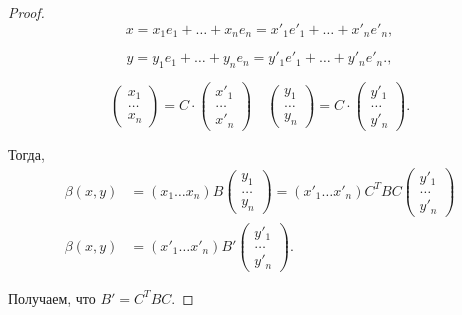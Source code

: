 \begin{proof}
    \begin{equation*}
        x = x_1 e_1 + \dots + x_n e_n = x'_1 e'_1 + \dots + x'_n e'_n
    ,\end{equation*}

    \begin{equation*}
        y = y_1 e_1 + \dots + y_n e_n = y'_1 e'_1 + \dots + y'_n e'_n.
    ,\end{equation*}

    \begin{equation*}
        \begin{pmatrix} x_1 \\ \dots \\ x_n \end{pmatrix} = C \cdot \begin{pmatrix} x'_1 \\ \dots \\ x'_n \end{pmatrix} \quad \begin{pmatrix} y_1 \\ \dots \\ y_n \end{pmatrix} = C \cdot \begin{pmatrix} y'_1 \\ \dots \\ y'_n \end{pmatrix}
    .\end{equation*}

    Тогда,
    \begin{align*}
        \beta(x, y) &= (x_1 \dots x_n) B \begin{pmatrix} y_1 \\ \dots \\ y_n \end{pmatrix} = (x'_1 \dots x'_n) C^{T} B C \begin{pmatrix} y'_1 \\ \dots \\ y'_n \end{pmatrix} \\
        \beta(x, y) &= (x'_1 \dots x'_n) B' \begin{pmatrix} y'_1 \\ \dots \\ y'_n \end{pmatrix}
    .\end{align*}

    Получаем, что $B' = C^{T} B C$.
\end{proof}

